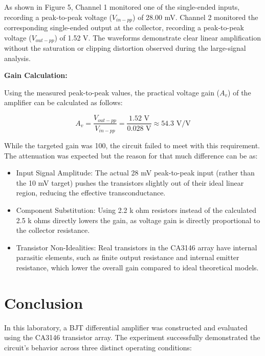 \documentclass[12pt]{article}
\begin{document}
As shown in Figure 5, Channel 1 monitored one of the single-ended inputs, recording a peak-to-peak voltage ($V_{in-pp}$) of 28.00 mV. Channel 2 monitored the corresponding single-ended output at the collector, recording a peak-to-peak voltage ($V_{out-pp}$) of 1.52 V. The waveforms demonstrate clear linear amplification without the saturation or clipping distortion observed during the large-signal analysis.

\textbf{Gain Calculation:} 

Using the measured peak-to-peak values, the practical voltage gain ($A_v$) of the amplifier can be calculated as follows:

$$A_v = \frac{V_{out-pp}}{V_{in-pp}} = \frac{1.52 \text{ V}}{0.028 \text{ V}} \approx 54.3 \text{ V/V}$$

While the targeted gain was 100, the circuit failed to meet with this requirement. The attenuation was expected but the reason for that much difference can be as: 

\begin{itemize}
    \item Input Signal Amplitude: The actual 28 mV peak-to-peak input (rather than the 10 mV target) pushes the transistors slightly out of their ideal linear region, reducing the effective transconductance.
    \item Component Substitution: Using 2.2 k ohm resistors instead of the calculated 2.5 k ohms directly lowers the gain, as voltage gain is directly proportional to the collector resistance.
    \item Transistor Non-Idealities: Real transistors in the CA3146 array have internal parasitic elements, such as finite output resistance and internal emitter resistance, which lower the overall gain compared to ideal theoretical models.
\end{itemize}

\section*{Conclusion}

In this laboratory, a BJT differential amplifier was constructed and evaluated using the CA3146 transistor array. The experiment successfully demonstrated the circuit's behavior across three distinct operating conditions:
\end{document}
